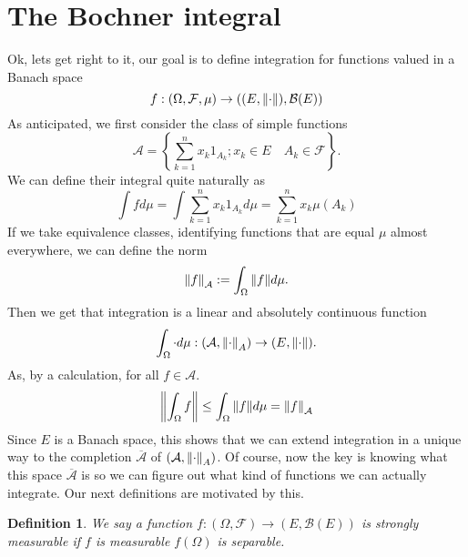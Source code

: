 \documentclass[12pt]{article}
\newtheorem{definition}{Definition}
\newcommand{\Aa}{\mathcal{A}}\newcommand{\Bb}{\mathcal{B}}\newcommand{\Cc}{\mathcal{C}}\newcommand{\Ee}{\mathcal{E}}\newcommand{\Ff}{\mathcal{F}}\newcommand{\Gg}{\mathcal{G}}\newcommand{\Hh}{\mathcal{H}}\newcommand{\Kk}{\mathcal{K}}\newcommand{\Ll}{\mathcal{L}}\newcommand{\Mm}{\mathcal{M}}\newcommand{\Nn}{\mathcal{N}}\newcommand{\Pp}{\mathcal{P}}\newcommand{\Qq}{\mathcal{Q}}\newcommand{\Rr}{{\mathcal R}}\newcommand{\Tt}{{\mathcal T}}\newcommand{\Zz}{{\mathcal Z}}\newcommand{\Uu}{{\mathcal U}}
\begin{document}
\section{The Bochner integral}
Ok, lets get right to it, our goal is to define integration for functions valued in a Banach space
\begin{equation*}
	f:(\Omega,\mathcal{F},\mu)\to ((E,\norm{\cdot}),\mathcal{B}(E))
\end{equation*}
As anticipated, we first consider the class of simple functions \begin{equation*}
	\Aa=\left\{\sum_{k=1}^{n} x_k 1_{A_k}; x_k\in E\quad A_k \in \Ff\right\}.
\end{equation*}
We can define their integral quite naturally as
\begin{equation*}
	\int f d\mu=\int \sum_{k=1}^n x_k 1_{A_k} d\mu=\sum_{k=1}^n x_k\mu({A_k})
\end{equation*}
If we take equivalence classes, identifying functions that are equal  $\mu $ almost everywhere, we can define the norm
\begin{equation*}
	\norm{f}_\Aa:=\int_\Omega \norm{f} d\mu.
\end{equation*}
Then we get that integration is a linear and absolutely continuous function
\begin{equation*}
	\int_\Omega \cdot d\mu : \qty(\Aa,\norm{\cdot}_A)\to (E,\norm{\cdot}).
\end{equation*}
As, by a calculation, for all $f\in\Aa$.
\begin{equation*}
	\norm{\int_\Omega f}\leq\int_\Omega \norm{f} d\mu=\norm{f}_\Aa
\end{equation*}
Since $E$ is a Banach space, this shows that we can extend \cite{Continuousextension} integration in a unique way to the completion $\overline{\Aa}$ of $(\Aa,\norm{\cdot}_A)$.
Of course, now the key is knowing what this space $\overline{\Aa}$ is so we can figure out what kind of functions we can actually integrate. Our next definitions are motivated by this.
\begin{definition}
	We say a function $f:(\Omega,\mathcal{F})\to (E,\mathcal{B}(E))$ is strongly measurable if $f$ is measurable $f(\Omega)$ is separable.
\end{definition}
\end{document}
